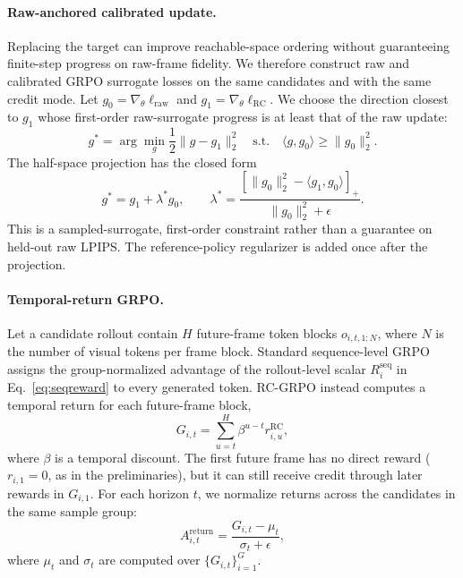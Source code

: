 \documentclass[letterpaper]{article} %
\begin{document}
\paragraph{Raw-anchored calibrated update.}
Replacing the target can improve reachable-space ordering without guaranteeing finite-step progress on raw-frame fidelity. We therefore construct raw and calibrated GRPO surrogate losses on the same candidates and with the same credit mode. Let $g_0=\nabla_\theta\ell_{\mathrm{raw}}$ and $g_1=\nabla_\theta\ell_{\mathrm{RC}}$. We choose the direction closest to $g_1$ whose first-order raw-surrogate progress is at least that of the raw update:
\begin{equation}
g^*=\arg\min_g\frac{1}{2}\|g-g_1\|_2^2
\quad\mathrm{s.t.}\quad
\langle g,g_0\rangle\geq\|g_0\|_2^2.
\end{equation}
The half-space projection has the closed form
\begin{equation}
g^*=g_1+\lambda^*g_0,\qquad
\lambda^*=\frac{[\|g_0\|_2^2-\langle g_1,g_0\rangle]_+}
{\|g_0\|_2^2+\epsilon}.
\end{equation}
This is a sampled-surrogate, first-order constraint rather than a guarantee on held-out raw LPIPS. The reference-policy regularizer is added once after the projection.

\paragraph{Temporal-return GRPO.}
Let a candidate rollout contain $H$ future-frame token blocks $o_{i,t,1:N}$, where $N$ is the number of visual tokens per frame block. Standard sequence-level GRPO assigns the group-normalized advantage of the rollout-level scalar $R_i^{\mathrm{seq}}$ in Eq.~\ref{eq:seqreward} to every generated token. RC-GRPO instead computes a temporal return for each future-frame block,
\begin{equation}
G_{i,t}
=
\sum_{u=t}^{H}
\beta^{u-t} r_{i,u}^{\mathrm{RC}},
\end{equation}
where $\beta$ is a temporal discount. The first future frame has no direct reward ($r_{i,1}=0$, as in the preliminaries), but it can still receive credit through later rewards in $G_{i,1}$. For each horizon $t$, we normalize returns across the candidates in the same sample group:
\begin{equation}
A_{i,t}^{\mathrm{return}}
=
\frac{G_{i,t}-\mu_t}{\sigma_t+\epsilon},
\end{equation}
where $\mu_t$ and $\sigma_t$ are computed over $\{G_{i,t}\}_{i=1}^{G}$.
\end{document}
